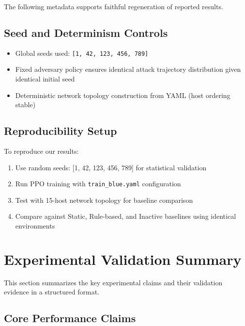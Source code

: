 \documentclass[12pt,oneside]{article}
\begin{document}
The following metadata supports faithful regeneration of reported results.

\subsection{Seed and Determinism Controls}
\begin{itemize}
    \item Global seeds used: \texttt{[1, 42, 123, 456, 789]}
    \item Fixed adversary policy ensures identical attack trajectory distribution given identical initial seed
    \item Deterministic network topology construction from YAML (host ordering stable)
\end{itemize}

\subsection{Reproducibility Setup}
To reproduce our results:
\begin{enumerate}
    \item Use random seeds: [1, 42, 123, 456, 789] for statistical validation
    \item Run PPO training with \texttt{train\_blue.yaml} configuration 
    \item Test with 15-host network topology for baseline comparison
    \item Compare against Static, Rule-based, and Inactive baselines using identical environments
\end{enumerate}

\section{Experimental Validation Summary}

This section summarizes the key experimental claims and their validation evidence in a structured format.

\subsection{Core Performance Claims}
\end{document}
